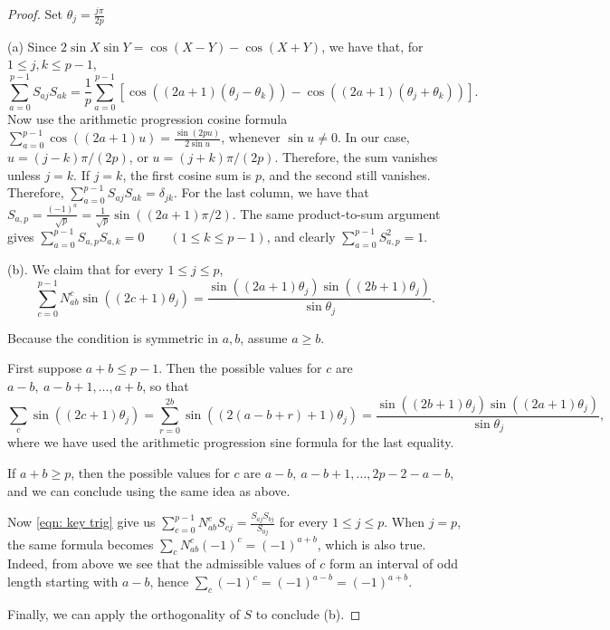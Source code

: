 \documentclass[11pt]{amsart}
\begin{document}
\begin{proof}
Set $\theta_j=\frac{j\pi}{2p}$

(a)
Since $2\sin X\sin Y=\cos(X-Y)-\cos(X+Y)$, we have that, for $1\leq j,k\leq p-1$,
\[
\sum_{a=0}^{p-1}S_{aj}S_{ak}
=
\frac1p
\sum_{a=0}^{p-1}
\left[
\cos((2a+1)(\theta_j-\theta_k))
-
\cos((2a+1)(\theta_j+\theta_k))
\right].
\]
Now use the arithmetic progression cosine formula
$\sum_{a=0}^{p-1}\cos((2a+1)u)=\frac{\sin(2pu)}{2\sin u}$,
whenever $\sin u\neq 0$. In our case, $u=(j-k)\pi/(2p)$, or $u=(j+k)\pi/(2p)$. Therefore, the sum vanishes unless $j=k$. 
If $j=k$, the first cosine sum is $p$, and the second still vanishes. Therefore, $\sum_{a=0}^{p-1}S_{aj}S_{ak}=\delta_{jk}$.
For the last column, we have that $S_{a,p}=\frac{(-1)^a}{\sqrt p}
=
\frac{1}{\sqrt p}\sin((2a+1)\pi/2)$.
The same product-to-sum argument gives $\sum_{a=0}^{p-1}S_{a,p}S_{a,k}=0
\qquad (1\leq k\leq p-1)$,
and clearly $\sum_{a=0}^{p-1}S_{a,p}^2=1$.

(b). 
We claim that for every $1\leq j\leq p$,
\begin{equation}
    \label{eqn: key trig}
    \sum_{c=0}^{p-1}N_{ab}^{c}\sin((2c+1)\theta_j)
=
\frac{
\sin((2a+1)\theta_j)\sin((2b+1)\theta_j)
}{
\sin\theta_j
}.
\end{equation}


Because the condition is symmetric in \(a,b\), assume \(a\geq b\).

First suppose \(a+b\leq p-1\). Then the possible values for $c$ are $a-b,\ a-b+1,\ldots,a+b$, so that \[\sum_c \sin((2c+1)\theta_j)
=
\sum_{r=0}^{2b}
\sin((2(a-b+r)+1)\theta_j)=\frac{
\sin((2b+1)\theta_j)\sin((2a+1)\theta_j)
}{
\sin\theta_j
},\]
where we have used the arithmetic progression sine formula for the last equality.

If $a+b\geq p$, then the possible values for $c$ are $a-b,\ a-b+1,\ldots,2p-2-a-b$, and we can conclude using the same idea as above.

Now \eqref{eqn: key trig} give us
$\sum_{c=0}^{p-1}N_{ab}^{c}S_{cj}
=
\frac{S_{aj}S_{bj}}{S_{0j}}$ for every $1\leq j\leq p$. 
When $j=p$, the same formula becomes $\sum_{c} N_{ab}^c(-1)^c=(-1)^{a+b}$, which is also true.
Indeed, from above we see that the admissible
values of $c$ form an interval of odd length starting with $a-b$, hence $\sum_c (-1)^c=(-1)^{a-b}=(-1)^{a+b}$.


Finally, we can apply the orthogonality of $S$ to conclude (b).
\end{proof}
\end{document}
